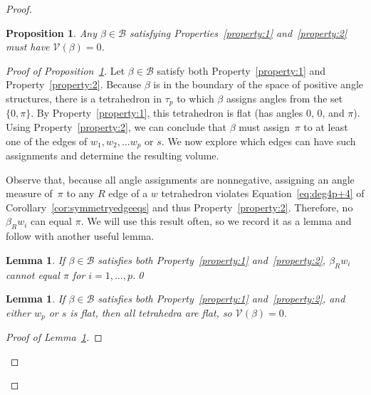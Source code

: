 \documentclass[reqno]{amsart}
\theoremstyle{plain}
\newtheorem{lem}[thm]{Lemma}
\newtheorem{prop}[thm]{Proposition}
\theoremstyle{definition}
\begin{document}
\begin{proof}
\begin{prop}\label{prop:volume=0}
Any $\beta\in\mathcal{B}$ satisfying Properties~\ref{property:1} and~\ref{property:2} must have $\mathcal{V}(\beta)=0$.
\end{prop}

\begin{proof}[Proof of Proposition~\ref{prop:volume=0}]

Let $\beta\in\mathcal{B}$ satisfy both Property~\ref{property:1} and Property~\ref{property:2}.  Because $\beta$ is in the boundary of the space of positive angle structures, there is a tetrahedron in $\tau_{p}$ to which $\beta$ assigns  angles from the set $\{0, \pi\}$.  By Property~\ref{property:1}, this tetrahedron is flat (has angles $0$, $0$, and $\pi$).  Using Property~\ref{property:2}, we can conclude that $\beta$ must assign~$\pi$ to at least one of the edges of $w_1, w_2, \dots w_p$ or $s$.  We now explore which edges can have such assignments and determine the resulting volume.

Observe that, because all angle assignments are nonnegative, assigning an angle measure of~$\pi$ to any $R$ edge of a $w$ tetrahedron violates Equation~\eqref{eq:deg4p+4} of Corollary~\ref{cor:symmetryedgeeqs} and thus Property~\ref{property:2}.  Therefore, no $\beta_R w_i$ can equal $\pi$.  We will use this result often, so we record it as a lemma and follow with another useful lemma.

\begin{lem}\label{lem:noRsarepi}
If $\beta\in\mathcal{B}$ satisfies both Property~\ref{property:1} and~\ref{property:2}, $\beta_R w_i$ cannot equal $\pi$ for $i=1,\dots,p$.\qed
\end{lem}


\begin{lem}\label{lem:wporsflat}
If $\beta\in\mathcal{B}$ satisfies both Property~\ref{property:1} and~\ref{property:2}, and either $w_p$ or $s$ is flat, then all tetrahedra are flat, so $\mathcal{V}(\beta)=0$.
\end{lem}

\begin{proof}[Proof of Lemma~\ref{lem:wporsflat}]


\end{proof}
\end{proof}
\end{proof}
\end{document}
